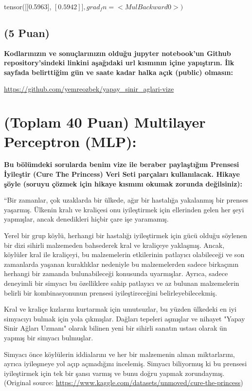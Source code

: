 \documentclass[11pt]{article}
\begin{document}
tensor([[0.5963],
$       [0.5942]], grad_fn=<MulBackward0>)
$

\subsection{(5 Puan)} \textbf{Kodlarınızın ve sonuçlarınızın olduğu jupyter notebook'un Github repository'sindeki linkini aşağıdaki url kısmının içine yapıştırın. İlk sayfada belirttiğim gün ve saate kadar halka açık (public) olmasın:}

\url{https://github.com/yemreozbek/yapay_sinir_aglari-vize}

\section{(Toplam 40 Puan) Multilayer Perceptron (MLP):} 
\textbf{Bu bölümdeki sorularda benim vize ile beraber paylaştığım Prensesi İyileştir (Cure The Princess) Veri Seti parçaları kullanılacak. Hikaye şöyle (soruyu çözmek için hikaye kısmını okumak zorunda değilsiniz):} 

``Bir zamanlar, çok uzaklarda bir ülkede, ağır bir hastalığa yakalanmış bir prenses yaşarmış. Ülkenin kralı ve kraliçesi onu iyileştirmek için ellerinden gelen her şeyi yapmışlar, ancak denedikleri hiçbir çare işe yaramamış.

Yerel bir grup köylü, herhangi bir hastalığı iyileştirmek için gücü olduğu söylenen bir dizi sihirli malzemeden bahsederek kral ve kraliçeye yaklaşmış. Ancak, köylüler kral ile kraliçeyi, bu malzemelerin etkilerinin patlayıcı olabileceği ve son zamanlarda yaşanan kuraklıklar nedeniyle bu malzemelerden sadece birkaçının herhangi bir zamanda bulunabileceği konusunda uyarmışlar. Ayrıca, sadece deneyimli bir simyacı bu özelliklere sahip patlayıcı ve az bulunan malzemelerin belirli bir kombinasyonunun prensesi iyileştireceğini belirleyebilecekmiş.

Kral ve kraliçe kızlarını kurtarmak için umutsuzlar, bu yüzden ülkedeki en iyi simyacıyı bulmak için yola çıkmışlar. Dağları tepeleri aşmışlar ve nihayet "Yapay Sinir Ağları Uzmanı" olarak bilinen yeni bir sihirli sanatın ustası olarak ün yapmış bir simyacı bulmuşlar.

Simyacı önce köylülerin iddialarını ve her bir malzemenin alınan miktarlarını, ayrıca iyileşmeye yol açıp açmadığını incelemiş. Simyacı biliyormuş ki bu prensesi iyileştirmek için tek bir şansı varmış ve bunu doğru yapmak zorundaymış. (Original source: \url{https://www.kaggle.com/datasets/unmoved/cure-the-princess})
\end{document}
